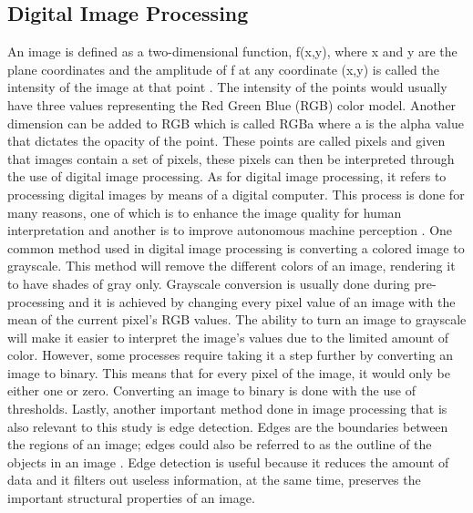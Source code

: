 \documentclass[journal]{./IEEE/IEEEtran}
\begin{document}
\subsection{Digital Image Processing}
An image is defined as a two-dimensional function, f(x,y), where x and y are the plane coordinates and the amplitude of f at any coordinate (x,y) is called the intensity of the image at that point \cite{Gonzalez2002}. The intensity of the points would usually have three values representing the Red Green Blue (RGB) color model. Another dimension can be added to RGB which is called RGBa where a is the alpha value that dictates the opacity of the point. These points are called pixels and given that images contain a set of pixels, these pixels can then be interpreted through the use of digital image processing.
\newline
\indent As for digital image processing, it refers to processing digital images by means of a digital computer. This process is done for many reasons, one of which is to enhance the image quality for human interpretation and another is to improve autonomous machine perception \cite{AbriolSantos12018}.
\newline
\indent One common method used in digital image processing is converting a colored image to grayscale. This method will remove the different colors of an image, rendering it to have shades of gray only. Grayscale conversion is usually done during pre-processing and it is achieved by changing every pixel value of an image with the mean of the current pixel's RGB values.
\newline
\indent The ability to turn an image to grayscale will make it easier to interpret the image's values due to the limited amount of color. However, some processes require taking it a step further by converting an image to binary. This means that for every pixel of the image, it would only be either one or zero. Converting an image to binary is done with the use of thresholds.
\newline
\indent Lastly, another important method done in image processing that is also relevant to this study is edge detection. Edges are the boundaries between the regions of an image; edges could also be referred to as the outline of the objects in an image \cite{Sharma2013}. Edge detection is useful because it reduces the amount of data and it filters out useless information, at the same time, preserves the important structural properties of an image.
\end{document}

